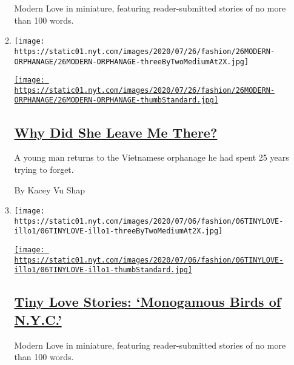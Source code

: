 \begin{enumerate}
\begin{enumerate}
    Modern Love in miniature, featuring reader-submitted stories of no
    more than 100 words.
  \item
    \texttt{[image: https://static01.nyt.com/images/2020/07/26/fashion/26MODERN-ORPHANAGE/26MODERN-ORPHANAGE-threeByTwoMediumAt2X.jpg]}

    \href{/2020/07/24/style/modern-love-adoption-vietnam-why-did-she-leave-me-there.html}{\texttt{[image: https://static01.nyt.com/images/2020/07/26/fashion/26MODERN-ORPHANAGE/26MODERN-ORPHANAGE-thumbStandard.jpg]}}

    \hypertarget{why-did-she-leave-me-there}{%
    \subsection{\texorpdfstring{\href{/2020/07/24/style/modern-love-adoption-vietnam-why-did-she-leave-me-there.html}{Why
    Did She Leave Me
    There?}}{Why Did She Leave Me There?}}\label{why-did-she-leave-me-there}}

    A young man returns to the Vietnamese orphanage he had spent 25
    years trying to forget.

    By Kacey Vu Shap
  \item
    \texttt{[image: https://static01.nyt.com/images/2020/07/06/fashion/06TINYLOVE-illo1/06TINYLOVE-illo1-threeByTwoMediumAt2X.jpg]}

    \href{/2020/07/21/style/tiny-modern-love-stories-coronavirus-monogamous-birds-of-nyc.html}{\texttt{[image: https://static01.nyt.com/images/2020/07/06/fashion/06TINYLOVE-illo1/06TINYLOVE-illo1-thumbStandard.jpg]}}

    \hypertarget{tiny-love-stories-monogamous-birds-of-nyc}{%
    \subsection{\texorpdfstring{\href{/2020/07/21/style/tiny-modern-love-stories-coronavirus-monogamous-birds-of-nyc.html}{Tiny
    Love Stories: `Monogamous Birds of
    N.Y.C.'}}{Tiny Love Stories: `Monogamous Birds of N.Y.C.'}}\label{tiny-love-stories-monogamous-birds-of-nyc}}

    Modern Love in miniature, featuring reader-submitted stories of no
    more than 100 words.
  \end{enumerate}
\end{enumerate}

